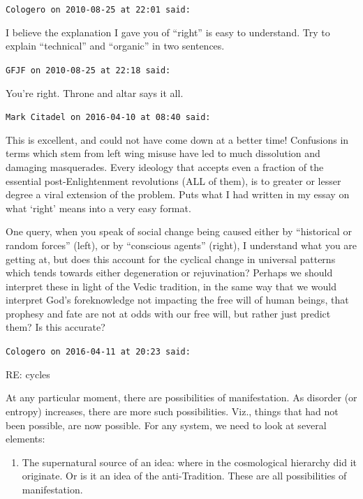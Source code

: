 \begin{footnotesize}
\begin{sffamily}
\hfill

\texttt{Cologero on 2010-08-25 at 22:01 said:}

I believe the explanation I gave you of ``right'' is easy to understand. Try to explain ``technical'' and ``organic'' in two sentences.

\hfill

\texttt{GFJF on 2010-08-25 at 22:18 said:}

You're right. Throne and altar says it all.

\hfill

\texttt{Mark Citadel on 2016-04-10 at 08:40 said:}

This is excellent, and could not have come down at a better time! Confusions in terms which stem from left wing misuse have led to much dissolution and damaging masquerades. Every ideology that accepts even a fraction of the essential post-Enlightenment revolutions (ALL of them), is to greater or lesser degree a viral extension of the problem. Puts what I had written in my essay on what `right' means into a very easy format.

One query, when you speak of social change being caused either by ``historical or random forces'' (left), or by ``conscious agents'' (right), I understand what you are getting at, but does this account for the cyclical change in universal patterns which tends towards either degeneration or rejuvination? Perhaps we should interpret these in light of the Vedic tradition, in the same way that we would interpret God's foreknowledge not impacting the free will of human beings, that prophesy and fate are not at odds with our free will, but rather just predict them? Is this accurate?

\hfill

\texttt{Cologero on 2016-04-11 at 20:23 said:}

RE: cycles

At any particular moment, there are possibilities of manifestation. As disorder (or entropy) increases, there are more such possibilities. Viz., things that had not been possible, are now possible. For any system, we need to look at several elements:

\begin{enumerate}


\item The supernatural source of an idea: where in the cosmological hierarchy did it originate. Or is it an idea of the anti-Tradition. These are all possibilities of manifestation.


\end{enumerate}
\end{sffamily}
\end{footnotesize}

